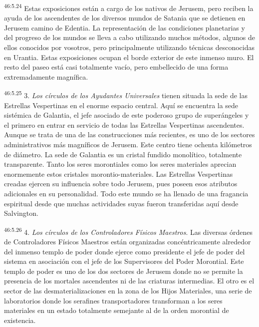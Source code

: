 \par
\textsuperscript{46:5.24} Estas exposiciones están a cargo de los nativos de Jerusem, pero reciben la ayuda de los ascendentes de los diversos mundos de Satania que se detienen en Jerusem camino de Edentia. La representación de las condiciones planetarias y del progreso de los mundos se lleva a cabo utilizando muchos métodos, algunos de ellos conocidos por vosotros, pero principalmente utilizando técnicas desconocidas en Urantia. Estas exposiciones ocupan el borde exterior de este inmenso muro. El resto del paseo está casi totalmente vacío, pero embellecido de una forma extremadamente magnífica.

\par
\textsuperscript{46:5.25} 3. \textit{Los círculos de los Ayudantes Universales} tienen situada la sede de las Estrellas Vespertinas en el enorme espacio central. Aquí se encuentra la sede sistémica de Galantia, el jefe asociado de este poderoso grupo de superángeles y el primero en entrar en servicio de todas las Estrellas Vespertinas ascendentes. Aunque se trata de una de las construcciones más recientes, es uno de los sectores administrativos más magníficos de Jerusem. Este centro tiene ochenta kilómetros de diámetro. La sede de Galantia es un cristal fundido monolítico, totalmente transparente. Tanto los seres morontiales como los seres materiales aprecian enormemente estos cristales morontio-materiales. Las Estrellas Vespertinas creadas ejercen su influencia sobre todo Jerusem, pues poseen esos atributos adicionales en su personalidad. Todo este mundo se ha llenado de una fragancia espiritual desde que muchas actividades suyas fueron transferidas aquí desde Salvington.

\par
\textsuperscript{46:5.26} 4. \textit{Los círculos de los Controladores Físicos Maestros}. Las diversas órdenes de Controladores Físicos Maestros están organizadas concéntricamente alrededor del inmenso templo de poder donde ejerce como presidente el jefe de poder del sistema en asociación con el jefe de los Supervisores del Poder Morontial. Este templo de poder es uno de los dos sectores de Jerusem donde no se permite la presencia de los mortales ascendentes ni de las criaturas intermedias. El otro es el sector de las desmaterializaciones en la zona de los Hijos Materiales, una serie de laboratorios donde los serafines transportadores transforman a los seres materiales en un estado totalmente semejante al de la orden morontial de existencia.

